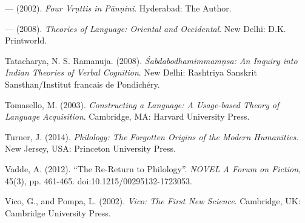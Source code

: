 \begin{thebibliography}{99}
  — (2002). \textit{Four Vrṇttis in Pānṇini}. Hyderabad: The Author.

  — (2008). \textit{Theories of Language: Oriental and Occidental}. New Delhi: D.K. Printworld.

  Tatacharya, N. S. Ramanuja. (2008). \textit{Śabdabodhamimmamṇsa: An Inquiry into Indian Theories of Verbal Cognition}. New Delhi: Rashtriya Sanskrit Sansthan/Institut francais de Pondichéry.

  Tomasello, M. (2003). \textit{Constructing a Language: A Usage-based Theory of Language Acquisition}. Cambridge, MA: Harvard University Press.

  Turner, J. (2014). \textit{Philology: The Forgotten Origins of the Modern Humanities}. New Jersey, USA: Princeton University Press.

  Vadde, A. (2012). “The Re-Return to Philology”. \textit{NOVEL A Forum on Fiction}, 45(3), pp. 461-465. doi:10.1215/00295132-1723053.

  Vico, G., and Pompa, L. (2002). \textit{Vico: The First New Science}. Cambridge, UK: Cambridge University Press.

 \end{thebibliography}

\theendnotes

